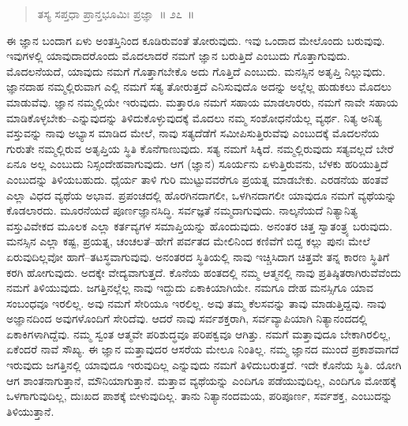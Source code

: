 \vspace{-0.2cm}

\begin{verse}
ತಸ್ಯ ಸಪ್ತಧಾ ಪ್ರಾನ್ತಭೂಮಿಃ ಪ್ರಜ್ಞಾ~॥ ೨೭~॥
\end{verse}

\vspace{-0.45cm}


\vspace{0.2cm}

ಈ ಜ್ಞಾನ ಬಂದಾಗ ಏಳು ಅಂತಸ್ತಿನಿಂದ ಕೂಡಿರುವಂತೆ ತೋರುವುದು. ಇವು ಒಂದಾದ ಮೇಲೊಂದು ಬರುವುವು. ಇವುಗಳಲ್ಲಿ ಯಾವುದಾದರೊಂದು ಮೊದಲಾದರೆ ನಮಗೆ ಜ್ಞಾನ ಬರುತ್ತಿದೆ ಎಂಬುದು ಗೊತ್ತಾಗುವುದು. ಮೊದಲನೆಯದೆ, ಯಾವುದು ನಮಗೆ ಗೊತ್ತಾಗಬೇಕೊ ಅದು ಗೊತ್ತಿದೆ ಎಂಬುದು. ಮನಸ್ಸಿನ ಅತೃಪ್ತಿ ನಿಲ್ಲುವುದು. ಜ್ಞಾನದಾಹ ನಮ್ಮಲ್ಲಿರುವಾಗ ಎಲ್ಲಿ ನಮಗೆ ಸತ್ಯ ತೋರುತ್ತದೆ ಎನಿಸುವುದೊ ಅದನ್ನು ಅಲ್ಲೆಲ್ಲ ಹುಡುಕಲು ಮೊದಲು ಮಾಡುವೆವು. ಜ್ಞಾನ ನಮ್ಮಲ್ಲಿಯೇ ಇರುವುದು. ಮತ್ತಾರೂ ನಮಗೆ ಸಹಾಯ ಮಾಡಲಾರರು, ನಮಗೆ ನಾವೇ ಸಹಾಯ ಮಾಡಿಕೊಳ್ಳಬೇಕು–ಎನ್ನುವುದನ್ನು ತಿಳಿದುಕೊಳ್ಳುವುದಕ್ಕೆ ಮೊದಲು ನಮ್ಮ ಸಂಶೋಧನೆಯೆಲ್ಲ ವ್ಯರ್ಥ. ನಿತ್ಯ ಅನಿತ್ಯ ವಸ್ತುವನ್ನು ನಾವು ಅಭ್ಯಾಸ ಮಾಡಿದ ಮೇಲೆ, ನಾವು ಸತ್ಯದೆಡೆಗೆ ಸಮೀಪಿಸುತ್ತಿರುವೆವು ಎಂಬುದಕ್ಕೆ ಮೊದಲನೆಯ ಗುರುತೇ ನಮ್ಮಲ್ಲಿರುವ ಅತೃಪ್ತಿಯ ಸ್ಥಿತಿ ಕೊನೆಗಾಣುವುದು. ಸತ್ಯ ನಮಗೆ ಸಿಕ್ಕಿದೆ. ನಮ್ಮಲ್ಲಿರುವುದು ಸತ್ಯವಲ್ಲದೆ ಬೇರೆ ಏನೂ ಅಲ್ಲ ಎಂಬುದು ನಿಸ್ಸಂದೇಹವಾಗುವುದು. ಆಗ (ಜ್ಞಾನ) ಸೂರ್ಯನು ಏಳುತ್ತಿರುವನು, ಬೆಳಕು ಹರಿಯುತ್ತಿದೆ ಎಂಬುದನ್ನು ತಿಳಿಯಬಹುದು. ಧೈರ್ಯ ತಾಳಿ ಗುರಿ ಮುಟ್ಟುವವರೆಗೂ ಪ್ರಯತ್ನ ಮಾಡಬೇಕು. ಎರಡನೆಯ ಹಂತವೆ ಎಲ್ಲಾ ವಿಧದ ವ್ಯಥೆಯ ಅಭಾವ. ಪ್ರಪಂಚದಲ್ಲಿ ಹೊರಗಿನದಾಗಲೀ, ಒಳಗಿನದಾಗಲೀ ಯಾವುದೂ ನಮಗೆ ವ್ಯಥೆಯನ್ನು ಕೊಡಲಾರದು. ಮೂರನೆಯದೆ ಪೂರ್ಣಜ್ಞಾನಸಿದ್ಧಿ. ಸರ್ವಜ್ಞತೆ ನಮ್ಮದಾಗುವುದು. ನಾಲ್ಕನೆಯದೆ ನಿತ್ಯಾನಿತ್ಯ ವಸ್ತುವಿವೇಕದ ಮೂಲಕ ಎಲ್ಲಾ ಕರ್ತವ್ಯಗಳ ಸಮಾಪ್ತಿಯನ್ನು ಹೊಂದುವುದು. ಅನಂತರ ಚಿತ್ತ ಸ್ವಾತಂತ್ರ್ಯ ಬರುವುದು. ಮನಸ್ಸಿನ ಎಲ್ಲಾ ಕಷ್ಟ, ಪ್ರಯತ್ನ, ಚಂಚಲತೆ–ಹೇಗೆ ಪರ್ವತದ ಮೇಲಿನಿಂದ ಕಣಿವೆಗೆ ಬಿದ್ದ ಕಲ್ಲು ಪುನಃ ಮೇಲೆ ಏರುವುದಿಲ್ಲವೋ ಹಾಗೆ–ತಟಸ್ಥವಾಗುವುವು. ಅನಂತರದ ಸ್ಥಿತಿಯಲ್ಲಿ ನಾವು ಇಚ್ಚಿಸಿದಾಗ ಚಿತ್ತವೇ ತನ್ನ ಕಾರಣ ಸ್ಥಿತಿಗೆ ಕರಗಿ ಹೋಗುವುದು. ಅದಕ್ಕೇ ವೇದ್ಯವಾಗುತ್ತದೆ. ಕೊನೆಯ ಹಂತದಲ್ಲಿ ನಮ್ಮ ಆತ್ಮನಲ್ಲಿ ನಾವು ಪ್ರತಿಷ್ಠಿತರಾಗಿರುವೆವೆಂದು ನಮಗೆ ತಿಳಿಯುವುದು. ಜಗತ್ತಿನಲ್ಲೆಲ್ಲ ನಾವು ಇದ್ದುದು ಏಕಾಕಿಯಾಗಿಯೇ. ನಮಗೂ ದೇಹ ಮನಸ್ಸಿಗೂ ಯಾವ ಸಂಬಂಧವೂ ಇರಲಿಲ್ಲ. ಅವು ನಮಗೆ ಸೇರಿಯೂ ಇರಲಿಲ್ಲ. ಅವು ತಮ್ಮ ಕೆಲಸವನ್ನು ತಾವು ಮಾಡುತ್ತಿದ್ದವು. ನಾವು ಅಜ್ಞಾನದಿಂದ ಅವುಗಳೊಂದಿಗೆ ಸೇರಿದೆವು. ಆದರೆ ನಾವು ಸರ್ವಶಕ್ತರಾಗಿ, ಸರ್ವವ್ಯಾಪಿಯಾಗಿ ನಿತ್ಯಾನಂದದಲ್ಲಿ ಏಕಾಕಿಗಳಾಗಿದ್ದೆವು. ನಮ್ಮ ಸ್ವಂತ ಆತ್ಮವೇ ಪರಿಶುದ್ಧವೂ ಪರಿಪಕ್ವವೂ ಆಗಿತ್ತು. ನಮಗೆ ಮತ್ತಾವುದೂ ಬೇಕಾಗಿರಲಿಲ್ಲ, ಏಕೆಂದರೆ ನಾವೆ ಸೌಖ್ಯ. ಈ ಜ್ಞಾನ ಮತ್ತಾವುದರ ಆಸರೆಯ ಮೇಲೂ ನಿಂತಿಲ್ಲ. ನಮ್ಮ ಜ್ಞಾನದ ಮುಂದೆ ಪ್ರಕಾಶವಾಗದೆ ಇರುವುದು ಜಗತ್ತಿನಲ್ಲಿ ಯಾವುದೂ ಇರುವುದಿಲ್ಲ ಎನ್ನುವುದು ನಮಗೆ ತಿಳಿದುಬರುತ್ತದೆ. ಇದೇ ಕೊನೆಯ ಸ್ಥಿತಿ. ಯೋಗಿ ಆಗ ಶಾಂತನಾಗುತ್ತಾನೆ, ಮೌನಿಯಾಗುತ್ತಾನೆ. ಮತ್ತಾವ ವ್ಯಥೆಯನ್ನು ಎಂದಿಗೂ ಪಡೆಯುವುದಿಲ್ಲ, ಎಂದಿಗೂ ಮೋಹಕ್ಕೆ ಒಳಗಾಗುವುದಿಲ್ಲ, ದುಃಖದ ಪಾಶಕ್ಕೆ ಬೀಳುವುದಿಲ್ಲ. ತಾನು ನಿತ್ಯಾನಂದಮಯ, ಪರಿಪೂರ್ಣ, ಸರ್ವಶಕ್ತ, ಎಂಬುದನ್ನು ತಿಳಿಯುತ್ತಾನೆ. 

